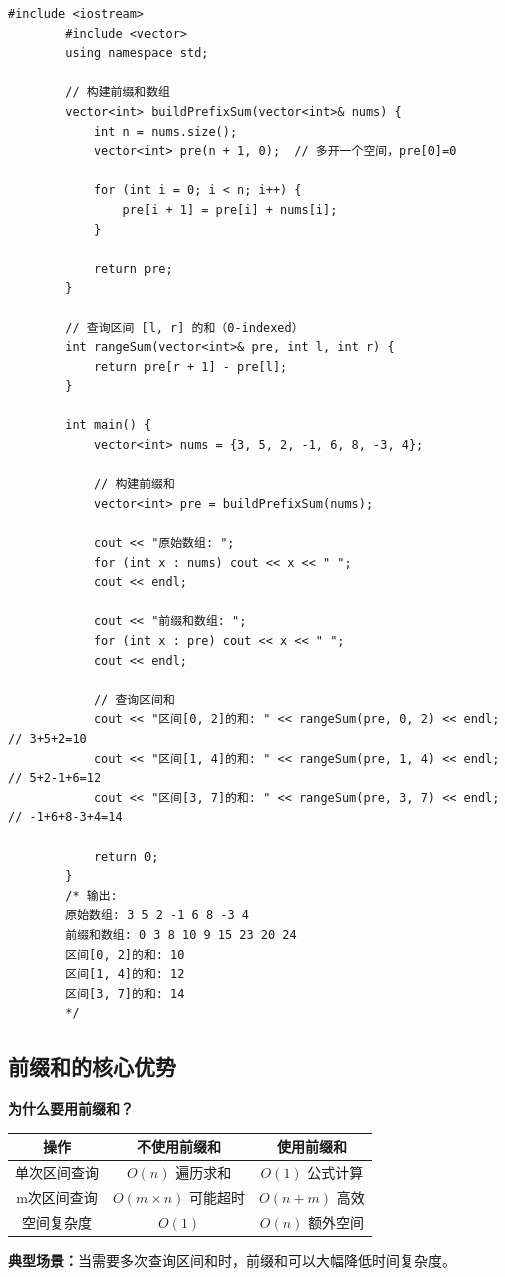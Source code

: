 \documentclass[12pt,a4paper]{article}
\begin{document}
	\begin{lstlisting}[caption={一维前缀和 - 基础模板}]
		#include <iostream>
		#include <vector>
		using namespace std;
		
		// 构建前缀和数组
		vector<int> buildPrefixSum(vector<int>& nums) {
			int n = nums.size();
			vector<int> pre(n + 1, 0);  // 多开一个空间，pre[0]=0
			
			for (int i = 0; i < n; i++) {
				pre[i + 1] = pre[i] + nums[i];
			}
			
			return pre;
		}
		
		// 查询区间 [l, r] 的和（0-indexed）
		int rangeSum(vector<int>& pre, int l, int r) {
			return pre[r + 1] - pre[l];
		}
		
		int main() {
			vector<int> nums = {3, 5, 2, -1, 6, 8, -3, 4};
			
			// 构建前缀和
			vector<int> pre = buildPrefixSum(nums);
			
			cout << "原始数组: ";
			for (int x : nums) cout << x << " ";
			cout << endl;
			
			cout << "前缀和数组: ";
			for (int x : pre) cout << x << " ";
			cout << endl;
			
			// 查询区间和
			cout << "区间[0, 2]的和: " << rangeSum(pre, 0, 2) << endl;  // 3+5+2=10
			cout << "区间[1, 4]的和: " << rangeSum(pre, 1, 4) << endl;  // 5+2-1+6=12
			cout << "区间[3, 7]的和: " << rangeSum(pre, 3, 7) << endl;  // -1+6+8-3+4=14
			
			return 0;
		}
		/* 输出:
		原始数组: 3 5 2 -1 6 8 -3 4 
		前缀和数组: 0 3 8 10 9 15 23 20 24 
		区间[0, 2]的和: 10
		区间[1, 4]的和: 12
		区间[3, 7]的和: 14
		*/
	\end{lstlisting}
	
	\subsection{前缀和的核心优势}
	
	\begin{greenbox}
		\textbf{为什么要用前缀和？}
		
		\begin{center}
			\begin{tabular}{|c|c|c|}
				\hline
				\textbf{操作} & \textbf{不使用前缀和} & \textbf{使用前缀和} \\
				\hline
				单次区间查询 & $O(n)$ 遍历求和 & $O(1)$ 公式计算 \\
				\hline
				m次区间查询 & $O(m \times n)$ 可能超时 & $O(n + m)$ 高效 \\
				\hline
				空间复杂度 & $O(1)$ & $O(n)$ 额外空间 \\
				\hline
			\end{tabular}
		\end{center}
		
		\textbf{典型场景：}当需要多次查询区间和时，前缀和可以大幅降低时间复杂度。
	\end{greenbox}
	
\end{document}
